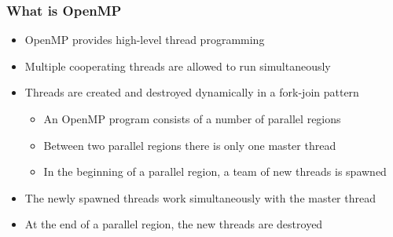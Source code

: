 \documentclass{beamer}
\begin{document}
\begin{frame}
\frametitle{What is OpenMP}

\begin{block}{}
\begin{itemize}
\item OpenMP provides high-level thread programming

\item Multiple cooperating threads are allowed to run simultaneously

\item Threads are created and destroyed dynamically in a fork-join pattern
\begin{itemize}

   \item An OpenMP program consists of a number of parallel regions

   \item Between two parallel regions there is only one master thread

   \item In the beginning of a parallel region, a team of new threads is spawned

\end{itemize}

\noindent
  \item The newly spawned threads work simultaneously with the master thread

  \item At the end of a parallel region, the new threads are destroyed
\end{itemize}

\noindent
\end{block}
\end{frame}
\end{document}
